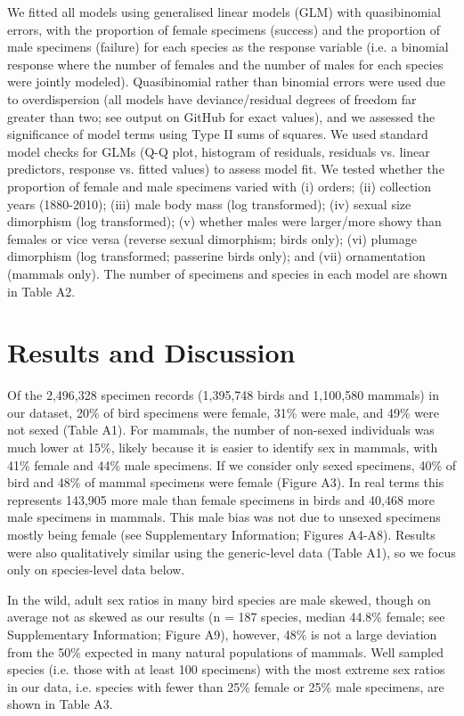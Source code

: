 \documentclass[a4paper, 12pt]{article}
\begin{document}
We fitted all models using generalised linear models (GLM) with quasibinomial errors, with the proportion of female specimens (success) and the proportion of male specimens (failure) for each species as the response variable (i.e. a binomial response where the number of females and the number of males for each species were jointly modeled). 
Quasibinomial rather than binomial errors were used due to overdispersion (all models have deviance/residual degrees of freedom far greater than two; see output on GitHub for exact values), and we assessed the significance of model terms using Type II sums of squares. 
We used standard model checks for GLMs (Q-Q plot, histogram of residuals, residuals vs. linear predictors, response vs. fitted values) to assess model fit. 
We tested whether the proportion of female and male specimens varied with (i) orders; (ii) collection years (1880-2010); (iii) male body mass (log transformed); (iv) sexual size dimorphism (log transformed); (v) whether males were larger/more showy than females or vice versa (reverse sexual dimorphism; birds only); (vi) plumage dimorphism (log transformed; passerine birds only); and (vii) ornamentation (mammals only). 
The number of specimens and species in each model are shown in Table A2.

\section{Results and Discussion}

Of the 2,496,328 specimen records (1,395,748 birds and 1,100,580 mammals) in our dataset, 20\% of bird specimens were female, 31\% were male, and 49\% were not sexed (Table A1). 
For mammals, the number of non-sexed individuals was much lower at 15\%, likely because it is easier to identify sex in mammals, with 41\% female and 44\% male specimens. 
If we consider only sexed specimens, 40\% of bird and 48\% of mammal specimens were female (Figure A3). 
In real terms this represents 143,905 more male than female specimens in birds and 40,468 more male specimens in mammals. 
This male bias was not due to unsexed specimens mostly being female (see Supplementary Information; Figures A4-A8).
Results were also qualitatively similar using the generic-level data (Table A1), so we focus only on species-level data below.

In the wild, adult sex ratios in many bird species are male skewed, though on average not as skewed as our results (n = 187 species, median 44.8\% female\cite{szekely2014sex}; see Supplementary Information; Figure A9), however, 48\% is not a large deviation from the 50\% expected in many natural populations of mammals\cite{karlin1986theoretical}.
Well sampled species (i.e. those with at least 100 specimens) with the most extreme sex ratios in our data, i.e. species with fewer than 25\% female or 25\% male specimens, are shown in Table A3.
\end{document}
